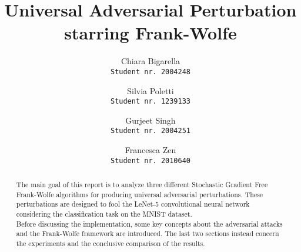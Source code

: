 \documentclass[10pt,twocolumn,letterpaper]{article}
\begin{document}
\title{Universal Adversarial Perturbation \\ starring Frank-Wolfe}
\author{Chiara Bigarella\\{\tt\footnotesize Student nr. 2004248}\and Silvia Poletti\\{\tt\footnotesize Student nr. 1239133}\and Gurjeet Singh\\{\tt\footnotesize Student nr. 2004251}\and Francesca Zen\\{\tt\footnotesize Student nr. 2010640}}
\maketitle

\begin{abstract}
	The main goal of this report is to analyze three different Stochastic Gradient Free Frank-Wolfe algorithms for producing universal adversarial perturbations. These perturbations are designed to fool the LeNet-5 convolutional neural network considering the classification task on the MNIST dataset.\\
	\indent Before discussing the implementation, some key concepts about the adversarial attacks and the Frank-Wolfe framework are introduced. The last two sections instead concern the experiments and the conclusive comparison of the results.
\end{abstract}













{\small
	
	
}
\end{document}
